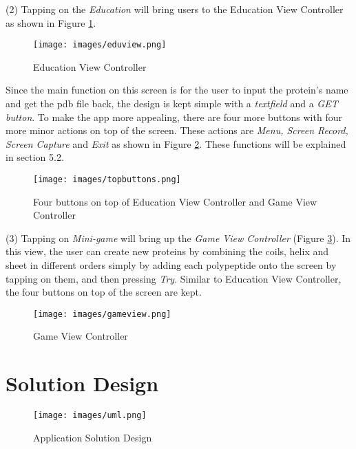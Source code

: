 (2) Tapping on the \emph{Education} will bring users to the Education View Controller as shown in Figure \ref{fig:eduview}.
\begin{figure}[!htp]
	\centering
	\texttt{[image: images/eduview.png]}
	\caption{Education View Controller}
	\label{fig:eduview}
\end{figure}
Since the main function on this screen is for the user to input the protein’s name and get the pdb file back,  the design is kept simple with a \emph{textfield} and a \emph{GET button}. To make the app more appealing, there are four more buttons with four more minor actions on top of the screen. These actions are \emph{Menu, Screen Record, Screen Capture} and \emph{Exit} as shown in Figure \ref{fig:topbuttons}. These functions will be explained in section 5.2.   
\begin{figure}[!htp]
	\centering
	\texttt{[image: images/topbuttons.png]}
	\caption{Four buttons on top of Education View Controller and Game View Controller}
	\label{fig:topbuttons}
\end{figure}

(3) Tapping on \emph{Mini-game} will bring up the \emph{Game View Controller} (Figure \ref{fig:gameview}).
In this view, the user can create new proteins by combining the coils, helix and sheet in different orders simply by adding each polypeptide onto the screen by tapping on them, and then pressing \emph{Try}. Similar to Education View Controller, the four buttons on top of the screen are kept. 
\begin{figure}[!htp]
	\centering
	\texttt{[image: images/gameview.png]}
	\caption{Game View Controller}
	\label{fig:gameview}
\end{figure}


\section{Solution Design}
\begin{figure}[!htp]
	\centering
	\texttt{[image: images/uml.png]}
	\caption{Application Solution Design}
	\label{fig:uml}
\end{figure}

